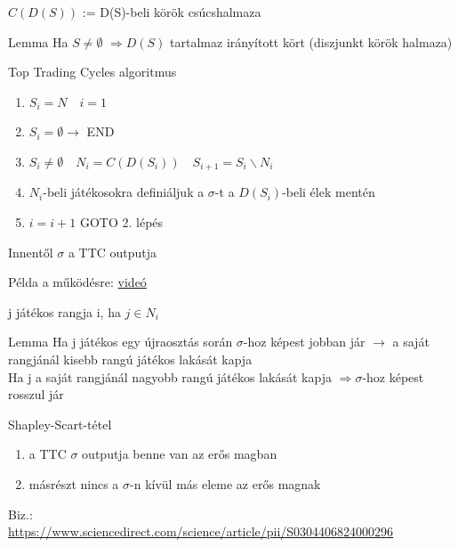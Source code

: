 		
	\begin{definition}{}{}
		$C(D(S))$ := D(S)-beli körök csúcshalmaza
	\end{definition}
	
	\begin{theorem}{Lemma}{}
		Ha $S \neq \emptyset$ $\Rightarrow D(S)$ tartalmaz irányított kört (diszjunkt körök halmaza)
	\end{theorem}
	
	\begin{definition}{Top Trading Cycles algoritmus}{}
		\begin{enumerate}
			\item $S_i = N \quad i = 1$
			\item $S_i = \emptyset \rightarrow $ END
			\item $S_i \neq \emptyset \quad N_i = C(D(S_i)) \quad S_{i+1} =  S_i\backslash N_i$
			\item $N_i$-beli játékosokra definiáljuk a $\sigma$-t a $D(S_i)$-beli élek mentén
			\item $i = i+1$ GOTO 2. lépés
		\end{enumerate}
	\end{definition}
	
	\begin{remark}{}{}
		Innentől $\sigma$ a TTC outputja
	\end{remark}
	
	Példa a működésre: \href{https://blockchain-academy.hs-mittweida.de/courses/game-theory-blockchain/lessons/cooperative-game-theory/topic/top-trading-cycle-algorithm/}{videó}

	
	\begin{definition}{}{}
		j játékos rangja i, ha $j \in N_i$
	\end{definition}
	
	\begin{theorem}{Lemma}{}
		Ha j játékos egy újraosztás során $\sigma$-hoz képest jobban jár $\rightarrow$ a saját rangjánál kisebb rangú játékos lakását kapja \\
		Ha j a saját rangjánál nagyobb rangú játékos lakását kapja $\Rightarrow \sigma$-hoz képest rosszul jár 
	\end{theorem}
	
	\begin{theorem}{Shapley-Scart-tétel}{}
		\begin{enumerate}
			\item a TTC $\sigma$ outputja benne van az erős magban
			\item másrészt nincs a $\sigma$-n kívül más eleme az erős magnak
		\end{enumerate}
	\end{theorem}
	Biz.: \\
	\url{https://www.sciencedirect.com/science/article/pii/S0304406824000296}
	
